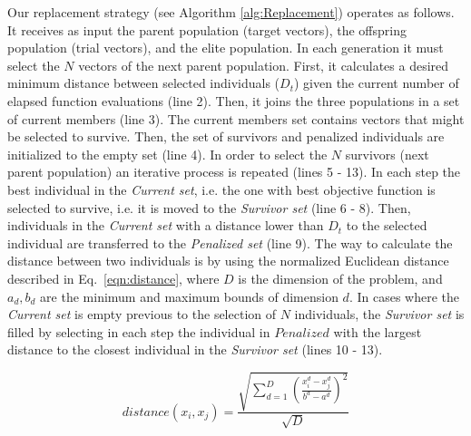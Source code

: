 Our replacement strategy (see Algorithm \ref{alg:Replacement}) operates as follows.
%
It receives as input the parent population (target vectors), the offspring population (trial vectors), and the elite population.
%
In each generation it must select the $N$ vectors of the next parent population.
%
First, it calculates a desired minimum distance between selected individuals ($D_t$) given the current number of elapsed function evaluations (line 2).
%
Then, it joins the three populations in a set of current members (line 3).
%
The current members set contains vectors that might be selected to survive.
%
Then, the set of survivors and penalized individuals are initialized to the empty set (line 4).
%
In order to select the $N$ survivors (next parent population) an iterative process is repeated (lines 5 - 13).
%
In each step the best individual in the \textit{Current set}, i.e. the one with best objective function is selected
to survive, i.e. it is moved to the \textit{Survivor set} (line 6 - 8).
%
Then, individuals in the \textit{Current set} with a distance lower than $D_t$ to the selected individual are transferred to the \textit{Penalized set} (line 9).
%
The way to calculate the distance between two individuals is by using the normalized Euclidean distance described in Eq.~\ref{eqn:distance}, where $D$ is the dimension of the problem, and $a_d, b_d$ are the minimum and maximum bounds of dimension $d$.
%
%
In cases where the \textit{Current set} is empty previous to the selection of $N$ individuals, the \textit{Survivor set} is filled by selecting in each step 
the individual in $Penalized$ with the largest distance to the closest individual in the \textit{Survivor set} (lines 10 - 13).

\begin{equation}\label{eqn:distance}
distance ( x_{i}, x_j ) = \frac{\sqrt{ \sum_{d=1}^D \left ( \frac{x_{i}^d - x_j^d}{b^d - a^d} \right )^2  }} {\sqrt{D}}
\end{equation}


